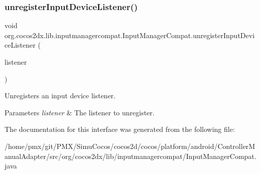 \subsubsection{\texorpdfstring{unregister\+Input\+Device\+Listener()}{unregisterInputDeviceListener()}\hspace{0.1cm}{\footnotesize\ttfamily [2/2]}}
{\footnotesize\ttfamily void org.\+cocos2dx.\+lib.\+inputmanagercompat.\+Input\+Manager\+Compat.\+unregister\+Input\+Device\+Listener (\begin{DoxyParamCaption}\item[{Input\+Manager\+Compat.\+Input\+Device\+Listener}]{listener }\end{DoxyParamCaption})}

Unregisters an input device listener.


\begin{DoxyParams}{Parameters}
{\em listener} & The listener to unregister. \\
\hline
\end{DoxyParams}


The documentation for this interface was generated from the following file\+:\begin{DoxyCompactItemize}
\item 
/home/pmx/git/\+P\+M\+X/\+Simu\+Cocos/cocos2d/cocos/platform/android/\+Controller\+Manual\+Adapter/src/org/cocos2dx/lib/inputmanagercompat/Input\+Manager\+Compat.\+java\end{DoxyCompactItemize}
